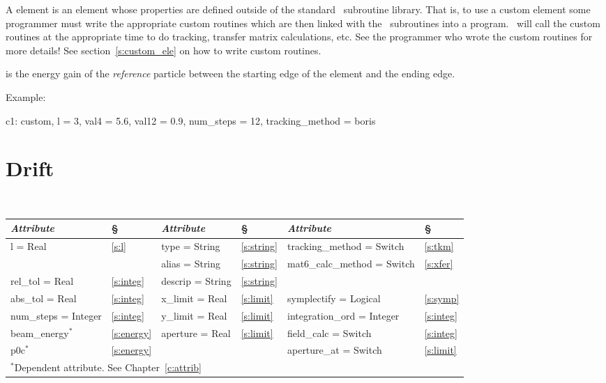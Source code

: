 A  element is an element whose properties are defined
outside of the standard \bmad\ subroutine library. That is, to use a
custom element some programmer must write the appropriate custom
routines which are then linked with the \bmad\ subroutines into a
program. \bmad\ will call the custom routines at the appropriate time
to do tracking, transfer matrix calculations, etc. See the programmer
who wrote the custom routines for more details! See 
section~\ref{s:custom_ele} on how to write custom routines.

 is the energy gain of the {\it reference} particle
between the starting edge of the element and the ending edge.

Example:
\begin{example}
  c1: custom, l = 3, val4 = 5.6, val12 = 0.9, num_steps = 12, tracking_method = boris
\end{example}

\section{Drift}
\label{s:drift}

\begin{center}
\tt
\begin{tabular}{|l|l||l|l||l|l|} \hline
  {\sl Attribute} & \S  & {\sl Attribute} & \S & {\sl Attribute} & \S \\ \hline
  l        = Real       & \ref{s:l}     & type = String    & \ref{s:string} & tracking\_method = Switch    & \ref{s:tkm}   \\ \hline
                        &               & alias = String   & \ref{s:string} & mat6\_calc\_method = Switch  & \ref{s:xfer}  \\ \hline
  rel\_tol = Real       & \ref{s:integ} & descrip = String & \ref{s:string} &                              &               \\ \hline
  abs\_tol = Real       & \ref{s:integ} & x\_limit = Real  & \ref{s:limit}  & symplectify = Logical        & \ref{s:symp}  \\ \hline
  num\_steps = Integer  & \ref{s:integ} & y\_limit = Real  & \ref{s:limit}  & integration\_ord = Integer   & \ref{s:integ} \\ \hline
  beam\_energy$^*$      & \ref{s:energy}& aperture = Real  & \ref{s:limit}  & field\_calc = Switch         & \ref{s:integ} \\ \hline
  p0c$^*$               & \ref{s:energy}&                  &                & aperture\_at = Switch        & \ref{s:limit} \\ \hline
  \multicolumn{6}{l}{\small $^*$Dependent attribute. See Chapter~\ref{c:attrib}} \\
\end{tabular}
\end{center}
\toffset

